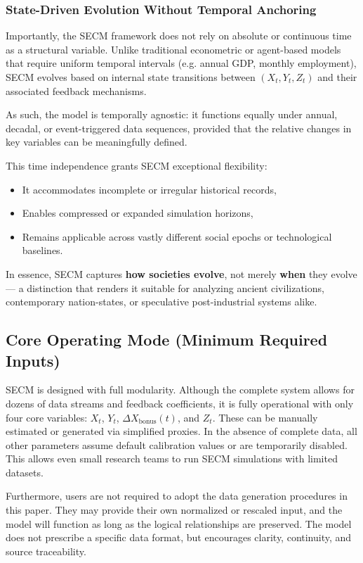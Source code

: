 \documentclass[12pt]{report}
\begin{document}
\subsubsection{State-Driven Evolution Without Temporal Anchoring}
Importantly, the SECM framework does not rely on absolute or continuous time as a structural variable. Unlike traditional econometric or agent-based models that require uniform temporal intervals (e.g. annual GDP, monthly employment), SECM evolves based on internal state transitions between $(X_t, Y_t, Z_t)$ and their associated feedback mechanisms.

As such, the model is temporally agnostic: it functions equally under annual, decadal, or event-triggered data sequences, provided that the relative changes in key variables can be meaningfully defined.

This time independence grants SECM exceptional flexibility:
\begin{itemize}
  \item It accommodates incomplete or irregular historical records,
  \item Enables compressed or expanded simulation horizons,
  \item Remains applicable across vastly different social epochs or technological baselines.
\end{itemize}
In essence, SECM captures \textbf{how societies evolve}, not merely \textbf{when} they evolve --- a distinction that renders it suitable for analyzing ancient civilizations, contemporary nation-states, or speculative post-industrial systems alike.
\subsection{Core Operating Mode (Minimum Required Inputs)}
SECM is designed with full modularity. Although the complete system allows for dozens of data streams and feedback coefficients, it is fully operational with only four core variables: $X_t$, $Y_t$, $\Delta X_{\text{bonus}}(t)$, and $Z_t$. These can be manually estimated or generated via simplified proxies. In the absence of complete data, all other parameters assume default calibration values or are temporarily disabled. This allows even small research teams to run SECM simulations with limited datasets.

Furthermore, users are not required to adopt the data generation procedures in this paper. They may provide their own normalized or rescaled input, and the model will function as long as the logical relationships are preserved. The model does not prescribe a specific data format, but encourages clarity, continuity, and source traceability.
\end{document}
